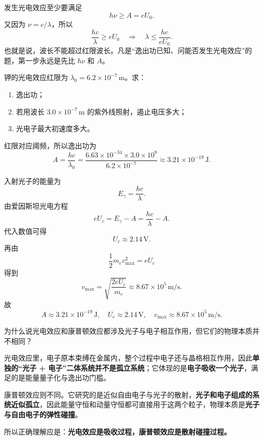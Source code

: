 \documentclass[lang=cn,11pt]{elegantbook}
\begin{document}
\begin{solution}
发生光电效应至少要满足
\[
h\nu\ge A=eU_0.
\]
又因为 \(\nu=c/\lambda\)，所以
\[
\frac{hc}{\lambda}\ge eU_0
\quad\Longrightarrow\quad
\boxed{\lambda\le \frac{hc}{eU_0}.}
\]
也就是说，波长不能超过红限波长。凡是“逸出功已知、问能否发生光电效应”的题，第一步永远是先比 \(h\nu\) 和 \(A\)。
\end{solution}

\begin{example}
钾的光电效应红限为 \(\lambda_0=6.2\times 10^{-7}\,\mathrm{m}\)。求：
\begin{enumerate}
  \item 逸出功；
  \item 若用波长 \(3.0\times 10^{-7}\,\mathrm{m}\) 的紫外线照射，遏止电压多大；
  \item 光电子最大初速度多大。
\end{enumerate}
\end{example}

\begin{solution}
红限对应阈频，所以逸出功为
\[
A=\frac{hc}{\lambda_0}
=\frac{6.63\times 10^{-34}\times 3.0\times 10^8}{6.2\times 10^{-7}}
\approx 3.21\times 10^{-19}\,\mathrm{J}.
\]

入射光子的能量为
\[
E_\gamma=\frac{hc}{\lambda}.
\]
由爱因斯坦光电方程
\[
eU_c=E_\gamma-A=\frac{hc}{\lambda}-A.
\]
代入数值可得
\[
U_c\approx 2.14\,\mathrm{V}.
\]
再由
\[
\frac12 m_ev_{\max}^2=eU_c
\]
得到
\[
v_{\max}=\sqrt{\frac{2eU_c}{m_e}}
\approx 8.67\times 10^5\,\mathrm{m/s}.
\]
故
\[
\boxed{
A\approx 3.21\times 10^{-19}\,\mathrm{J},\quad
U_c\approx 2.14\,\mathrm{V},\quad
v_{\max}\approx 8.67\times 10^5\,\mathrm{m/s}.
}
\]
\end{solution}

\begin{example}[光电效应与康普顿效应的本质区别]
为什么说光电效应和康普顿效应都涉及光子与电子相互作用，但它们的物理本质并不相同？
\end{example}

\begin{solution}
光电效应里，电子原本束缚在金属内，整个过程中电子还与晶格相互作用，因此\textbf{单独的“光子 + 电子”二体系统并不是孤立系统}；它体现的是\textbf{电子吸收一个光子}，满足的是能量量子化与逸出功门槛。

康普顿效应则不同。它研究的是近似自由电子与光子的散射，\textbf{光子和电子组成的系统近似孤立}，因此能量守恒和动量守恒都可直接用于这两个粒子，物理本质是\textbf{光子与自由电子的弹性碰撞}。

所以正确理解应是：\textbf{光电效应是吸收过程，康普顿效应是散射碰撞过程。}
\end{solution}
\end{document}
